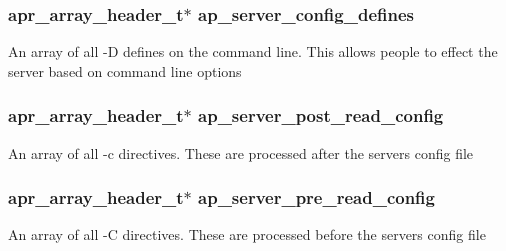 \subsubsection[{\texorpdfstring{ap\+\_\+server\+\_\+config\+\_\+defines}{ap_server_config_defines}}]{ {\bf apr\+\_\+array\+\_\+header\+\_\+t}$\ast$ ap\+\_\+server\+\_\+config\+\_\+defines}\hypertarget{group__APACHE__CORE__MAIN_ga6402302ec770b2decb574b57bbbe0fb8}{}\label{group__APACHE__CORE__MAIN_ga6402302ec770b2decb574b57bbbe0fb8}
An array of all -\/D defines on the command line. This allows people to effect the server based on command line options 
\subsubsection[{\texorpdfstring{ap\+\_\+server\+\_\+post\+\_\+read\+\_\+config}{ap_server_post_read_config}}]{ {\bf apr\+\_\+array\+\_\+header\+\_\+t}$\ast$ ap\+\_\+server\+\_\+post\+\_\+read\+\_\+config}\hypertarget{group__APACHE__CORE__MAIN_ga02ae1d9605521ea5e5485bc183f039ad}{}\label{group__APACHE__CORE__MAIN_ga02ae1d9605521ea5e5485bc183f039ad}
An array of all -\/c directives. These are processed after the server\textquotesingle{}s config file 
\subsubsection[{\texorpdfstring{ap\+\_\+server\+\_\+pre\+\_\+read\+\_\+config}{ap_server_pre_read_config}}]{ {\bf apr\+\_\+array\+\_\+header\+\_\+t}$\ast$ ap\+\_\+server\+\_\+pre\+\_\+read\+\_\+config}\hypertarget{group__APACHE__CORE__MAIN_gad3ee3481f3fb8dd80854e22780fd7ef3}{}\label{group__APACHE__CORE__MAIN_gad3ee3481f3fb8dd80854e22780fd7ef3}
An array of all -\/C directives. These are processed before the server\textquotesingle{}s config file 

